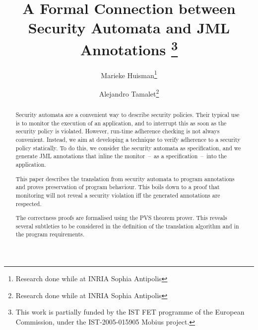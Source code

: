 \documentclass[]{llncs}
\title{A Formal Connection between Security Automata and JML Annotations
\thanks{This work is partially funded by the IST FET
programme of the European Commission, under the IST-2005-015905
\textsf{Mobius} project.}}
\author{Marieke Huisman\inst{1}\thanks{Research done while at INRIA Sophia Antipolis} \and Alejandro Tamalet\inst{2}\thanks{Research done while at INRIA Sophia Antipolis}}
\institute{University of Twente, Netherlands \and
University of Nijmegen, Netherlands}
\begin{document}
\maketitle
\begin{abstract}
Security automata are a convenient way to describe security
policies. Their typical use is to monitor the execution of an
application, and to interrupt this as soon as the security policy is
violated. However, run-time adherence checking is not always
convenient. Instead, we aim at developing a technique to verify
adherence to a security policy statically.  To do this, we consider
the security automata as specification, and we generate JML
annotations that inline the monitor~--~as a specification~--~into the
application.

This paper describes the translation from security automata to program
annotations and proves preservation of program behaviour. This boils
down to a proof that monitoring will not reveal a security violation
iff the generated annotations are respected.

The correctness proofs are formalised using the PVS theorem prover.
This reveals several subtleties to be considered in the definition of the
translation algorithm and in the program requirements.
\end{abstract}










%

\end{document}
